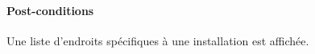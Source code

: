 \paragraph{Post-conditions}
\begin{list}{}{\leftmargin=1.5em}
\item{Une liste d'endroits spécifiques à une installation est affichée.}
\end{list}
%

